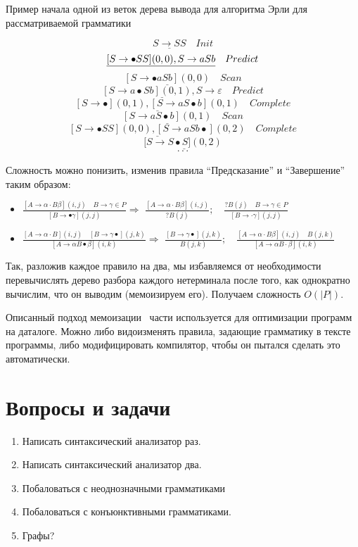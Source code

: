 \begin{example} Пример начала одной из веток дерева вывода для алгоритма Эрли для рассматриваемой грамматики
	
	$$\underline{S \rightarrow SS} \quad Init$$
	$$\underline{[S \rightarrow \bullet SS](0,0), \space S \rightarrow aSb} \quad Predict$$
	$$\underline{[S \rightarrow \bullet aSb](0,0)} \quad Scan$$
	$$\underline{[S \rightarrow a \bullet Sb](0,1), S \rightarrow \varepsilon} \quad Predict$$
	$$\underline{[S \rightarrow \bullet](0, 1), [S \rightarrow aS \bullet b](0,1)} \quad Complete$$
	$$\underline{[S \rightarrow aS \bullet b](0,1)} \quad Scan$$
	$$\underline{[S \rightarrow \bullet SS](0,0),[S \rightarrow aSb \bullet](0,2)} \quad Complete$$
	$$[\underline{S \rightarrow S \bullet S](0,2)}$$
	$$\cdot\cdot\cdot$$
	
\end{example}

Сложность можно понизить, изменив правила ``Предсказание'' и ``Завершение'' таким образом:
\begin{itemize}
	\item $\frac{[A \rightarrow \alpha \cdot B \beta](i, j) \quad B \rightarrow \gamma \in P}{[B \rightarrow \bullet \gamma](j, j)} \Rightarrow$ $
	\frac{[A \rightarrow \alpha \cdot B \beta](i, j)}{? B(j)}; \quad \frac{? B(j) \quad B \rightarrow \gamma \in P}{[B \rightarrow \cdot \gamma](j, j)}$
	\item $\frac{[A \rightarrow \alpha \cdot B](i, j) \quad[B \rightarrow \gamma \bullet](j, k)}{[A \rightarrow \alpha B \bullet \beta](i, k)} \Rightarrow$ $\frac{[B \rightarrow \gamma \bullet](j, k)}{B(j, k)}; \quad \frac{[A \rightarrow \alpha \cdot B \beta](i, j) \quad B(j, k)}{[A \rightarrow \alpha B \cdot \beta](i, k)}$
\end{itemize}
Так, разложив каждое правило на два, мы избавляемся от необходимости перевычислять дерево разбора каждого нетерминала после того, как однократно вычислим, что он выводим (мемоизируем его). Получаем сложность $O(|P|)$.

Описанный подход мемоизации~\cite{Magic} части используется для оптимизации программ на даталоге. Можно либо видоизменять правила, задающие грамматику в тексте программы, либо модифицировать компилятор, чтобы он пытался сделать это автоматически. 
\section{Вопросы и задачи}
\begin{enumerate}
  \item Написать синтаксический анализатор раз.
  \item Написать синтаксический анализатор два.
  \item Побаловаться с неоднозначными грамматиками
  \item Побаловаться с конъюнктивными грамматиками.
  \item Графы?
\end{enumerate}